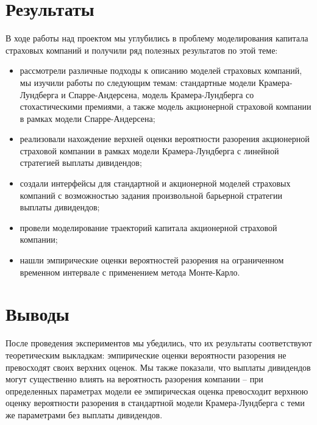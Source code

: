 \documentclass{article}
\theoremstyle{plain}
\theoremstyle{plain}
\theoremstyle{plain}
\theoremstyle{plain}
\theoremstyle{definition}
\theoremstyle{remark}
\begin{document}
\clearpage

\section{Результаты}

В ходе работы над проектом мы углубились в проблему моделирования капитала страховых компаний и получили ряд полезных результатов по этой теме:

\begin{itemize}
    \item рассмотрели различные подходы к описанию моделей страховых компаний, мы изучили работы по следующим темам: стандартные модели Крамера-Лундберга и Спарре-Андерсена, модель Крамера-Лундберга со стохастическими премиями, а также модель акционерной страховой компании в рамках модели Спарре-Андерсена;
    
    \item реализовали нахождение верхней оценки вероятности разорения акционерной страховой компании в рамках модели Крамера-Лундберга с линейной стратегией выплаты дивидендов;
    
    \item создали интерфейсы для стандартной и акционерной моделей страховых компаний с возможностью задания произвольной барьерной стратегии выплаты дивидендов;
    
    \item провели моделирование траекторий капитала акционерной страховой компании;
    
    \item нашли эмпирические оценки вероятностей разорения на ограниченном временном интервале с применением метода Монте-Карло.
\end{itemize}


\section{Выводы}

После проведения экспериментов мы убедились, что их результаты соответствуют теоретическим выкладкам: эмпирические оценки вероятности разорения не превосходят своих верхних оценок. Мы также показали, что выплаты дивидендов могут существенно влиять на вероятность разорения компании -- при определенных параметрах модели ее эмпирическая оценка превосходит верхнюю оценку вероятности разорения в стандартной модели Крамера-Лундберга с теми же параметрами без выплаты дивидендов.
\end{document}
